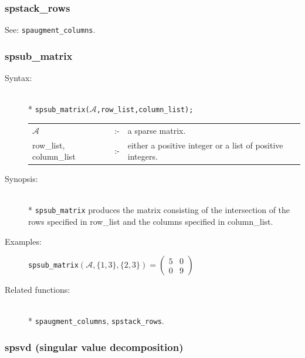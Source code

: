 \subsubsection{spstack\_rows}
\label{sparse:spstack_rows}
\hypertarget{operator:SPSTACK_ROWS}{}

See: \texttt{spaugment\_columns}.


\subsubsection{spsub\_matrix}
\label{sparse:spsub_matrix}
\hypertarget{operator:SPSUB_MATRIX}{}

\begin{description}
\item[Syntax:]\mbox{}\\*
{\tt spsub\_matrix($\mathcal{A}$,row\_list,column\_list);}\\[2mm]
\begin{tabular}{l l l}
$\mathcal{A}$              &:-& a sparse matrix. \\
row\_list, column\_list &:-& \parbox[t]{.605\linewidth}{either a
positive integer or a list of positive integers.}
\end{tabular}

\item[Synopsis:]\mbox{}\\*
\texttt{spsub\_matrix} produces the matrix consisting of the
              intersection of the rows specified in row\_list and the
columns specified in column\_list.

\item[Examples:]
\hspace*{0.1in}
\texttt{spsub\_matrix}\((\mathcal{A},\{1,3\},\{2,3\}) =
        \begin{pmatrix} 5 & 0\\ 0 & 9 \end{pmatrix}\)

\item[Related functions:]\mbox{}\\*
\texttt{spaugment\_columns}, \texttt{spstack\_rows}.
\end{description}

\subsubsection{spsvd (singular value decomposition)}
\label{sparse:spsvd}
\hypertarget{operator:SPSVD}{}

